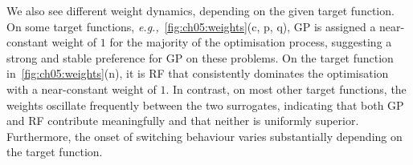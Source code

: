 We also see different weight dynamics, depending on the given target function. 
On some target functions, \emph{e.g.,}~\cref{fig:ch05:weights}(c, p, q), GP is assigned a near-constant weight of $1$ for the majority of the optimisation process, suggesting a strong and 
stable preference for GP on these problems.
On the target function in~\cref{fig:ch05:weights}(n), it is RF that consistently dominates the optimisation with a near-constant weight of $1$.
In contrast, on most other target functions, the weights oscillate frequently between the two surrogates, indicating that both GP and RF contribute meaningfully and that neither is uniformly superior.
Furthermore, the onset of switching behaviour varies substantially depending on the target function.
